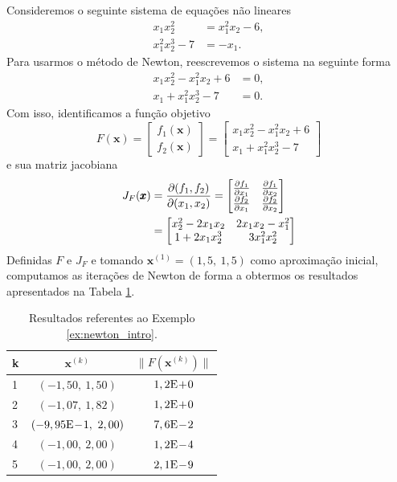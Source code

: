 \begin{ex}\label{ex:newton_intro}
  Consideremos o seguinte sistema de equações não lineares
  \begin{align}
    x_1x_2^2 &= x_1^2x_2 - 6,\\
    x_1^2x_2^3 - 7 &= -x_1.
  \end{align}
  Para usarmos o método de Newton, reescrevemos o sistema na seguinte forma
  \begin{align}
    x_1x_2^2 - x_1^2x_2 + 6 &= 0,\\
    x_1 + x_1^2x_2^3 - 7 &= 0.
  \end{align}
  Com isso, identificamos a função objetivo
  \begin{equation}
    F(\pmb{x}) =
    \begin{bmatrix}
      f_1(\pmb{x})\\
      f_2(\pmb{x})
    \end{bmatrix}
=
    \begin{bmatrix}
      x_1x_2^2 - x_1^2x_2 + 6\\
      x_1 + x_1^2x_2^3 - 7
    \end{bmatrix}
  \end{equation}
  e sua matriz jacobiana
  \begin{align}
    J_F(\pmb{x}) &= \frac{\partial(f_1, f_2)}{\partial(x_1, x_2)} =
          \begin{bmatrix}
            \frac{\partial f_1}{\partial x_1} & \frac{\partial f_1}{\partial x_2}\\
            \frac{\partial f_2}{\partial x_1} & \frac{\partial f_2}{\partial x_2}\\
          \end{bmatrix}\\
    &=
      \begin{bmatrix}
        x_2^2 - 2x_1x_2 & 2x_1x_2-x_1^2\\
        1+2x_1x_2^3 & 3x_1^2x_2^2
      \end{bmatrix}
  \end{align}
  Definidas $F$ e $J_F$ e tomando $\pmb{x}^{(1)} = (1,5,~1,5)$ como aproximação inicial, computamos as iterações de Newton de forma a obtermos os resultados apresentados na Tabela \ref{tab:newton_intro}.

  \begin{table}[h!]
    \centering
    \begin{tabular}{lcc}
      k & $\pmb{x}^{(k)}$ & $\|F(\pmb{x}^{(k)})\|$\\\hline
      1 & $(-1,50,~1,50)$ & $1,2\mathrm{E}\!+\!0$\\
      2 & $(-1,07,~1,82)$ & $1,2\mathrm{E}\!+\!0$\\
      3 & $(-9,95\mathrm{E}\!-\!1,~2,00)$ & $7,6\mathrm{E}\!-\!2$\\
      4 & $(-1,00,~2,00)$ & $1,2\mathrm{E}\!-\!4$ \\
      5 & $(-1,00,~2,00)$ & $2,1\mathrm{E}\!-\!9$ \\\hline
    \end{tabular}
    \caption{Resultados referentes ao Exemplo \ref{ex:newton_intro}.}
    \label{tab:newton_intro}
  \end{table}


\end{ex}
